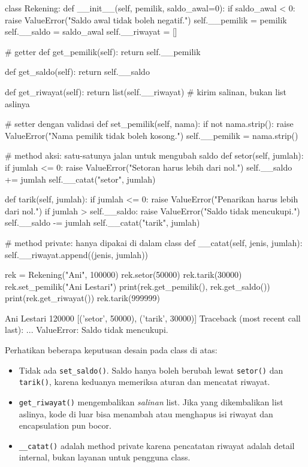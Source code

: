 \begin{kode}
class Rekening:
    def __init__(self, pemilik, saldo_awal=0):
        if saldo_awal < 0:
            raise ValueError("Saldo awal tidak boleh negatif.")
        self.__pemilik = pemilik
        self.__saldo = saldo_awal
        self.__riwayat = []

    # getter
    def get_pemilik(self):
        return self.__pemilik

    def get_saldo(self):
        return self.__saldo

    def get_riwayat(self):
        return list(self.__riwayat)    # kirim salinan, bukan list aslinya

    # setter dengan validasi
    def set_pemilik(self, nama):
        if not nama.strip():
            raise ValueError("Nama pemilik tidak boleh kosong.")
        self.__pemilik = nama.strip()

    # method aksi: satu-satunya jalan untuk mengubah saldo
    def setor(self, jumlah):
        if jumlah <= 0:
            raise ValueError("Setoran harus lebih dari nol.")
        self.__saldo += jumlah
        self.__catat("setor", jumlah)

    def tarik(self, jumlah):
        if jumlah <= 0:
            raise ValueError("Penarikan harus lebih dari nol.")
        if jumlah > self.__saldo:
            raise ValueError("Saldo tidak mencukupi.")
        self.__saldo -= jumlah
        self.__catat("tarik", jumlah)

    # method private: hanya dipakai di dalam class
    def __catat(self, jenis, jumlah):
        self.__riwayat.append((jenis, jumlah))


rek = Rekening("Ani", 100000)
rek.setor(50000)
rek.tarik(30000)
rek.set_pemilik("Ani Lestari")
print(rek.get_pemilik(), rek.get_saldo())
print(rek.get_riwayat())
rek.tarik(999999)
\end{kode}

\begin{keluaran}
Ani Lestari 120000
[('setor', 50000), ('tarik', 30000)]
Traceback (most recent call last):
  ...
ValueError: Saldo tidak mencukupi.
\end{keluaran}

Perhatikan beberapa keputusan desain pada class di atas:

\begin{itemize}
  \item Tidak ada \texttt{set\_saldo()}. Saldo hanya boleh berubah lewat \texttt{setor()} dan \texttt{tarik()}, karena keduanya memeriksa aturan dan mencatat riwayat.
  \item \texttt{get\_riwayat()} mengembalikan \emph{salinan} list. Jika yang dikembalikan list aslinya, kode di luar bisa menambah atau menghapus isi riwayat dan encapsulation pun bocor.
  \item \texttt{\_\_catat()} adalah method private karena pencatatan riwayat adalah detail internal, bukan layanan untuk pengguna class.
\end{itemize}


